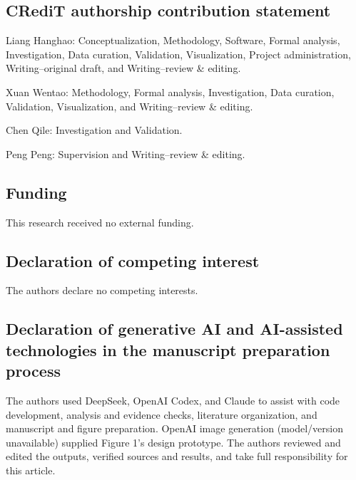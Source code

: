\subsection*{CRediT authorship contribution statement}

Liang Hanghao: Conceptualization, Methodology, Software, Formal analysis, Investigation, Data curation, Validation, Visualization, Project administration, Writing--original draft, and Writing--review \& editing.

Xuan Wentao: Methodology, Formal analysis, Investigation, Data curation, Validation, Visualization, and Writing--review \& editing.

Chen Qile: Investigation and Validation.

Peng Peng: Supervision and Writing--review \& editing.

\subsection*{Funding}

This research received no external funding.

\subsection*{Declaration of competing interest}

The authors declare no competing interests.

\subsection*{Declaration of generative AI and AI-assisted technologies in the manuscript preparation process}

The authors used DeepSeek, OpenAI Codex, and Claude to assist with code development, analysis and evidence checks, literature organization, and manuscript and figure preparation. OpenAI image generation (model/version unavailable) supplied Figure 1's design prototype. The authors reviewed and edited the outputs, verified sources and results, and take full responsibility for this article.
